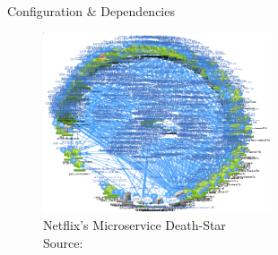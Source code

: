 \documentclass{beamer}
\begin{document}

\begin{frame}{}
  \begin{center}
    \Large Configuration \& Dependencies
  \end{center}
  \begin{figure}
    \includegraphics[width=0.6\textwidth]{img/netfix.png}
    \caption{\footnotesize Netflix's Microservice Death-Star \\\textcolor{uos-grey-full}{Source: {\cite{deathstar}}}}
  \end{figure}
\end{frame}

\end{document}
